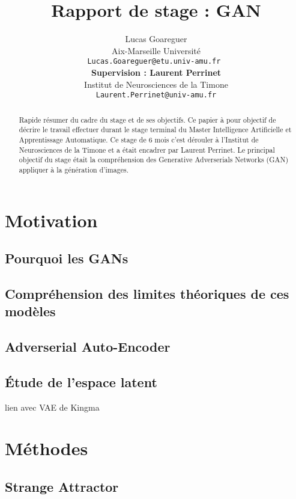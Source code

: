 \documentclass[11pt]{article}
\title{Rapport de stage : GAN}
\author{Lucas Goareguer \\
  Aix-Marseille Université \\
  \texttt{Lucas.Goareguer@etu.univ-amu.fr   } \\\And
   {\bf Supervision : Laurent Perrinet} \\
  Institut de Neurosciences de la Timone \\
  {\tt Laurent.Perrinet@univ-amu.fr} \\}
\date{}
\begin{document}
\maketitle
\begin{abstract}
Rapide résumer du cadre du stage et de ses objectifs.
Ce papier à pour objectif de décrire le travail effectuer durant le stage terminal du Master Intelligence Artificielle et Apprentissage Automatique.
Ce stage de 6 mois c'est dérouler à l'Institut de Neurosciences de la Timone et a était encadrer par Laurent Perrinet.
Le principal objectif du stage était la compréhension des Generative Adverserials Networks (GAN) appliquer à la génération d'images.
\end{abstract}


\section{Motivation}

\subsection{Pourquoi les GANs}

\subsection{Compréhension des limites théoriques de ces modèles}

\subsection{Adverserial Auto-Encoder}

\subsection{Étude de l'espace latent}
lien avec VAE de Kingma 
\section{Méthodes}

\subsection{Strange Attractor}
\end{document}
